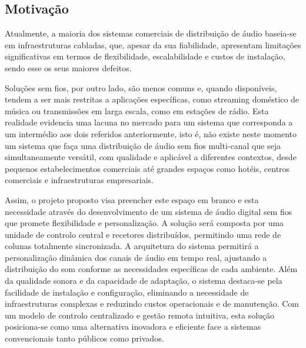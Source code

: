 \documentclass{article}
\begin{document}
\vspace{2cm}



\subsection{Motivação}

\vspace{0.1cm}


Atualmente, a maioria dos sistemas comerciais de distribuição de áudio baseia-se em infraestruturas cabladas, que, apesar da sua fiabilidade, apresentam limitações significativas em termos de flexibilidade, escalabilidade e custos de instalação, sendo esse os seus maiores defeitos.


Soluções sem fios, por outro lado, são menos comuns e, quando disponíveis, tendem a ser mais restritas a aplicações específicas, como streaming doméstico de música ou transmissões em larga escala, como em estações de rádio. 
Esta realidade evidencia uma lacuna no mercado para um sistema que corresponda a um intermédio aos dois referidos anteriormente, isto é, não existe neste momento um sistema que faça uma distribuição de áudio sem fios multi-canal que seja simultaneamente versátil, com qualidade e aplicável a diferentes contextos, desde pequenos estabelecimentos comerciais até grandes espaços como hotéis, centros comerciais e infraestruturas empresariais.


Assim, o projeto proposto visa preencher este espaço em branco e esta necessidade através do desenvolvimento de um sistema de áudio digital sem fios que promete flexibilidade e personalização. A solução será composta por uma unidade de controlo central e recetores distribuídos, permitindo uma rede de colunas totalmente sincronizada. A arquitetura do sistema permitirá a personalização dinâmica dos canais de áudio em tempo real, ajustando a distribuição do som conforme as necessidades específicas de cada ambiente.
Além da qualidade sonora e da capacidade de adaptação, o sistema destaca-se pela facilidade de instalação e configuração, eliminando a necessidade de infraestruturas complexas e reduzindo custos operacionais e de manutenção. Com um modelo de controlo centralizado e gestão remota intuitiva, esta solução posiciona-se como uma alternativa inovadora e eficiente face a sistemas convencionais tanto públicos como privados.



\vspace{0.8cm}
\end{document}
